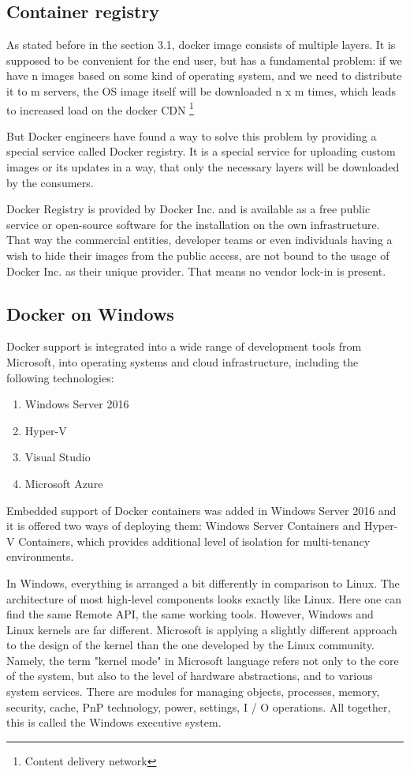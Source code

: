 \subsection{Container registry}

As stated before in the section 3.1, docker image consists of multiple layers.
It is supposed to be convenient for the end user,
but has a fundamental problem: if we have
n images based on some kind of operating system, and we need
to distribute it to m servers, the OS image itself will be downloaded
n x m times, which leads to increased
load on the docker CDN \footnote{Content delivery network}

But Docker engineers have found a way to solve this problem by providing
a special service called Docker registry. It is a special service for uploading
custom images or its updates in a way, that only the necessary layers will be
downloaded by the consumers\cite{AdrMouRegistries:2016}.

Docker Registry is provided by Docker Inc. and is available
as a free public service or open-source software
for the installation on the own infrastructure.
That way the commercial entities, developer teams or even individuals having a
wish to hide their images from the public access,
are not bound to the usage of Docker Inc. as their unique provider. That means
no vendor lock-in is present\cite{AdrMouRegistries:2016}.

\subsection{Docker on Windows}

Docker support is integrated into a wide range of development tools
from Microsoft, into operating systems and cloud infrastructure, including
the following technologies:
\begin{enumerate}
\item Windows Server 2016
\item Hyper-V
\item Visual Studio
\item Microsoft Azure
\end{enumerate}

Embedded support of Docker containers was added in Windows Server 2016 and it
is offered  two ways of  deploying them: Windows Server Containers and
Hyper-V Containers, which provides additional level of
isolation for multi-tenancy environments\cite{DockerOnWindows}.

In Windows, everything is arranged a bit differently in comparison to Linux.
The architecture of most high-level components looks exactly like Linux.
Here one can find the same Remote API, the same working tools.
However, Windows and Linux kernels are far different.
Microsoft is applying a slightly different approach to the design of the
kernel than the one developed by the Linux community.
Namely, the term "kernel mode" in Microsoft language refers not only to the
core of the system, but also to the level of hardware abstractions, and to
various system services.
There are modules for managing objects, processes, memory, security,
cache, PnP technology, power, settings, I / O operations.
All together, this is called the Windows executive system.

